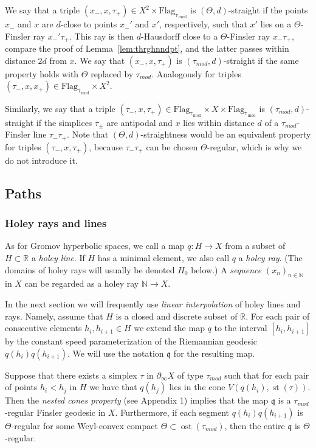 \documentclass[12pt]{article}
\theoremstyle{boldplain}
\theoremstyle{bolddefinition}
\numberwithin{equation}{section}
\def\R{{\mathbb R}}
\def\N{{\mathbb N}}
\def\Flagt{\operatorname{Flag_{\tau_{mod}}}}
\def\geo{\partial_{\infty}}
\def\st{\operatorname{st}}
\def\ost{\operatorname{ost}}
\def\taumod{\tau_{mod}}
\begin{document}
We say that a triple $(x_-,x,\tau_+)\in X^2\times\Flagt$ is $(\Theta,d)$-straight 
if the points $x_-$ and $x$ are $d$-close to points $x_-'$ and $x'$, respectively, 
such that $x'$ lies on a $\Theta$-Finsler ray $x_-'\tau_+$.
This ray is then $d$-Hausdorff close to a $\Theta$-Finsler ray $x_-\tau_+$,
compare the proof of Lemma~\ref{lem:thrghnndpt},
and the latter passes within distance $2d$ from $x$.
We say that $(x_-,x,\tau_+)$ is 
$(\taumod,d)$-straight if the same property holds with $\Theta$ replaced by $\taumod$.
Analogously for triples $(\tau_-,x,x_+)\in \Flagt\times X^2$.

Similarly,
we say that a triple $(\tau_-,x, \tau_+)\in\Flagt\times X\times\Flagt$ is $(\taumod,d)$-straight 
if the simplices $\tau_{\pm}$ are antipodal 
and $x$ lies within distance $d$ of a $\taumod$-Finsler line $\tau_-\tau_+$.
Note that $(\Theta,d)$-straightness would be an equivalent property for triples $(\tau_-,x, \tau_+)$, 
because $\tau_-\tau_+$ can be chosen $\Theta$-regular,
which is why we do not introduce it.



\subsection{Paths}
\subsubsection{Holey rays and lines}\label{sec:Holey rays and line}

As for Gromov hyperbolic spaces,
we call a map 
$q:H\to X$ from a subset of $H\subset\R$ 
a {\em holey line}.
If $H$ has a minimal element, we also call $q$ a {\em holey ray}.
(The domains of holey rays will usually be denoted $H_0$ below.)  
A {\em sequence} $(x_n)_{n\in\N}$ in $X$ can be regarded as a holey ray $\N\to X$.

{In the next section we will frequently use {\em linear interpolation} of holey lines and rays. Namely, assume that $H$ is a closed and discrete  subset of $\R$. For each pair of consecutive elements $h_i, h_{i+1}\in H$ we extend the map $q$ to the interval $[h_i, h_{i+1}]$ by the constant speed parameterization of the Riemannian geodesic $q(h_i)q(h_{i+1})$. We will use the notation ${\mathfrak q}$ for the resulting map.}  

{Suppose that there exists a simplex $\tau$ in $\geo X$ of type $\taumod$ such that for each 
pair of points $h_i< h_j$ in $H$ we have that $q(h_j)$ lies in the cone $V(q(h_i), \st(\tau))$. Then the 
 {\em nested cones property} (see Appendix 1) implies that the map ${\mathfrak q}$ is a $\taumod$-regular Finsler geodesic in $X$. Furthermore, if each segment $q(h_i)q(h_{i+1})$ is $\Theta$-regular for some Weyl-convex compact $\Theta\subset \ost(\taumod)$, then the entire ${\mathfrak q}$ is 
 $\Theta$-regular. }
\end{document}
